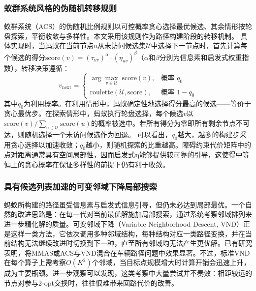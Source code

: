 \documentclass[lettersize,journal]{IEEEtran}
\begin{document}
\subsubsection{蚁群系统风格的伪随机转移规则}
蚁群系统（ACS）的伪随机比例规则\textcolor{blue}{\cite{ref22}}以可控概率贪心选择最优候选、其余情形按轮盘探索，平衡收敛与多样性。本文采用该规则作为路径构建阶段的转移机制。
具体实现时，当蚂蚁在当前节点$u$从未访问候选集$\mathcal{U}$中选择下一节点时，首先计算每个候选的得分$\mathrm{score}(v) = (\tau_{uv})^{\alpha} \cdot (\eta_{uv})^{\beta}$（$\alpha$和$\beta$分别为信息素和启发式权重指数），转移决策遵循：
\begin{equation}
v_{\mathrm{next}} =
\begin{cases}
\arg\max_{v \in \mathcal{U}} \; \mathrm{score}(v), & \text{概率 } q_0 \\
\mathrm{roulette}(\mathcal{U}, \mathrm{score}), & \text{概率 } 1 - q_0
\end{cases}
\label{eq:trans}
\end{equation}
其中$q_0$为利用概率。在利用情形中，蚂蚁确定性地选择得分最高的候选——等价于贪心最优步。在探索情形中，蚂蚁执行轮盘选择，每个候选$v$以$\mathrm{score}(v) / \sum_{u \in \mathcal{U}} \mathrm{score}(u)$的概率被选中。若所有得分为零即所有剩余节点不可达，则随机选择一个未访问候选作为回退。
可以看出，$q_0$越大，越多的构建步采用贪心选择以加速收敛；$q_0$越小，则随机探索的比重越高。障碍约束代价矩阵中的点对距离通常具有空间局部性，因而启发式$\bm{\eta}$能够提供较可靠的引导，这使得中等偏上的贪心概率在保证多样性的前提下仍有利于收敛。
\subsubsection{具有候选列表加速的可变邻域下降局部搜索}
\label{subsec:vnd}
蚂蚁所构建的路径虽受信息素与启发式信息引导，但仍未必达到局部最优。一个自然的改进思路是：在每一代对当前最优解施加局部搜索，通过系统考察邻域排列来进一步精化解的质量。可变邻域下降（Variable Neighborhood Descent, VND）\textcolor{blue}{\cite{ref24}}正是这样一类方法，它依次调用多种邻域结构，每种结构对应一类路径变换，并在当前结构无法继续改进时切换到下一种，直至所有邻域均无法产生更优解。已有研究表明，将MMAS或ACS与VND混合在车辆路径问题中效果显著\textcolor{blue}{\cite{ref25}}。不过，标准VND在每个算子上需考察$O(K^2)$个邻域，当目标点规模增大时计算开销会迅速上升，成为主要瓶颈。进一步观察可以发现，这类考察中大量尝试并不奏效：相距较远的节点对参与2-opt交换时，往往很难带来回路代价的改善。
\end{document}
